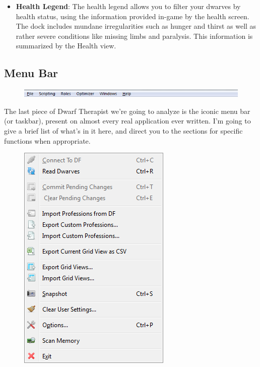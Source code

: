 \documentclass[]{article}
\begin{document}
\begin{itemize}
\begin{figure}[h!]
\begin{subfigure}[C]{0.45\linewidth}
        \end{subfigure}
\end{figure}

\item \textbf{Health Legend}: The health legend allows you to filter your dwarves by health status, using
the information provided in-game by the health screen. The dock includes mundane irregularities such as
hunger and thirst as well as rather severe conditions like missing limbs and paralysis. This information
is summarized by the Health view.
\end{itemize}

\newpage
\subsection{Menu Bar}
\label{sec:Menu Bar}
\begin{figure}[h!] \centering \includegraphics[width=\textwidth]{Sec1Fig17}
\end{figure}

The last piece of Dwarf Therapist we're going to analyze is the iconic menu bar (or taskbar), present on
almost every real application ever written. I'm going to give a brief list of what's in it here, and
direct you to the sections for specific functions when appropriate.
\vspace{12pt}
\begin{figure}
  \begin{center}
    \includegraphics{Sec1Fig18}
  \end{center}
\vspace{-10pt}
\end{figure}
\end{document}
